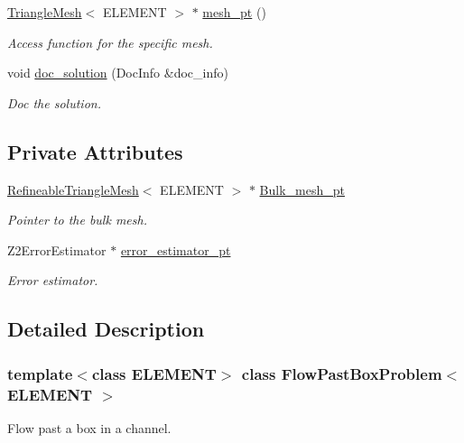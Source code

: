 \begin{DoxyCompactItemize}
\hyperlink{classoomph_1_1TriangleMesh}{Triangle\+Mesh}$<$ E\+L\+E\+M\+E\+NT $>$ $\ast$ \hyperlink{classFlowPastBoxProblem_a3efbee75a2cc6ca9d6ffd4ec0a3a2c52}{mesh\+\_\+pt} ()
\begin{DoxyCompactList}\small\item\em Access function for the specific mesh. \end{DoxyCompactList}\item 
void \hyperlink{classFlowPastBoxProblem_a7e2f3692ab8f492c6d5e967953c4a4ea}{doc\+\_\+solution} (Doc\+Info \&doc\+\_\+info)
\begin{DoxyCompactList}\small\item\em Doc the solution. \end{DoxyCompactList}\end{DoxyCompactItemize}
\subsection*{Private Attributes}
\begin{DoxyCompactItemize}
\item 
\hyperlink{classoomph_1_1RefineableTriangleMesh}{Refineable\+Triangle\+Mesh}$<$ E\+L\+E\+M\+E\+NT $>$ $\ast$ \hyperlink{classFlowPastBoxProblem_a5ffdeb61acb20f9c154fafad3c0196e8}{Bulk\+\_\+mesh\+\_\+pt}
\begin{DoxyCompactList}\small\item\em Pointer to the bulk mesh. \end{DoxyCompactList}\item 
Z2\+Error\+Estimator $\ast$ \hyperlink{classFlowPastBoxProblem_a44b20a7eb85ce8a902da6c6275f45278}{error\+\_\+estimator\+\_\+pt}
\begin{DoxyCompactList}\small\item\em Error estimator. \end{DoxyCompactList}\end{DoxyCompactItemize}


\subsection{Detailed Description}
\subsubsection*{template$<$class E\+L\+E\+M\+E\+NT$>$\newline
class Flow\+Past\+Box\+Problem$<$ E\+L\+E\+M\+E\+N\+T $>$}

Flow past a box in a channel. 

